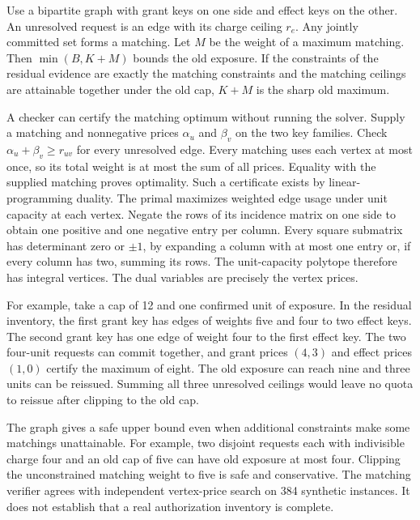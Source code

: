 \documentclass[11pt]{article}
\begin{document}
Use a bipartite graph with grant keys on one side and effect
keys on the other. An unresolved request is an edge with its
charge ceiling $r_e$. Any jointly committed set forms a
matching. Let $M$ be the weight of a maximum matching.
Then $\min(B,K+M)$ bounds the old exposure. If the constraints
of the residual evidence are exactly the matching constraints
and the matching ceilings are attainable together under the
old cap, $K+M$ is the sharp old maximum.

A checker can certify the matching optimum without running the
solver. Supply a matching and nonnegative prices $\alpha_u$
and $\beta_v$ on the two key families. Check
$\alpha_u+\beta_v\ge r_{uv}$ for every unresolved edge.
Every matching uses each vertex at most once, so its total
weight is at most the sum of all prices. Equality with the
supplied matching proves optimality. Such a certificate exists
by linear-programming duality. The primal maximizes weighted
edge usage under unit capacity at each vertex. Negate the rows
of its incidence matrix on one side to obtain one positive and
one negative entry per column. Every square submatrix has
determinant zero or $\pm1$, by expanding a column with at most
one entry or, if every column has two, summing its rows.
The unit-capacity polytope therefore has integral vertices.
The dual variables are precisely the vertex prices.

For example, take a cap of 12 and one confirmed unit of
exposure. In the residual inventory, the first grant key
has edges of weights five and four to two effect keys. The
second grant key has one edge of weight four to the first
effect key. The two four-unit requests can commit together,
and grant prices $(4,3)$ and effect prices $(1,0)$ certify
the maximum of eight. The old exposure can reach nine and
three units can be reissued. Summing all three unresolved
ceilings would leave no quota to reissue after clipping to
the old cap.

The graph gives a safe upper bound even when additional
constraints make some matchings unattainable. For example,
two disjoint requests each with indivisible charge four and
an old cap of five can have old exposure at most four.
Clipping the unconstrained matching weight to five is safe
and conservative. The matching verifier agrees with independent
vertex-price search on 384 synthetic instances. It does not
establish that a real authorization inventory is complete.
\end{document}

